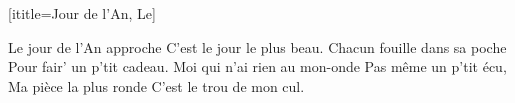 [ititle={Jour de l'An, Le}]

\beginverse
Le jour de l'An approche
C'est le jour le plus beau.
Chacun fouille dans sa poche
Pour fair' un p'tit cadeau.
Moi qui n'ai rien au mon-onde
Pas même un p'tit écu,
Ma pièce la plus ronde
C'est le trou de mon cul.
\endverse
\endsong
